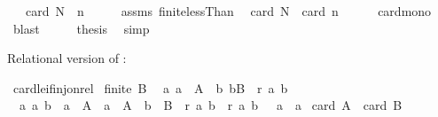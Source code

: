 \begin{isabellebody}
\ \ \ {\isachardoublequoteopen}card\ N\ {\isasymle}\ n{\isachardoublequoteclose}\isanewline
%
\isadelimproof
%
\endisadelimproof
%
\isatagproof
{}\isamarkupfalse%
\ {\isacharminus}{\kern0pt}\isanewline
\ \ \isamarkupfalse%
\ assms\ finite{\isacharunderscore}{\kern0pt}lessThan\ \isamarkupfalse%
\ {\isachardoublequoteopen}card\ N\ {\isasymle}\ card\ {\isacharbraceleft}{\kern0pt}{}{\isachardot}{\kern0pt}{\isachardot}{\kern0pt}{\isacharless}{\kern0pt}n{\isacharbraceright}{\kern0pt}{\isachardoublequoteclose}\isanewline
\ \ \ \ \isamarkupfalse%
\ card{\isacharunderscore}{\kern0pt}mono\ \isamarkupfalse%
\ blast\isanewline
\ \ \isamarkupfalse%
\ \isamarkupfalse%
\ {\isacharquery}{\kern0pt}thesis\ \isamarkupfalse%
\ simp\isanewline
{}\isamarkupfalse%
%
\endisatagproof
{\isafoldproof}%
%
\isadelimproof
%
\endisadelimproof
%
\begin{isamarkuptext}%
Relational version of :%
\end{isamarkuptext}\isamarkuptrue%
\isamarkupfalse%
\ card{\isacharunderscore}{\kern0pt}le{\isacharunderscore}{\kern0pt}if{\isacharunderscore}{\kern0pt}inj{\isacharunderscore}{\kern0pt}on{\isacharunderscore}{\kern0pt}rel{\isacharcolon}{\kern0pt}\isanewline
{}\ {\isachardoublequoteopen}finite\ B{\isachardoublequoteclose}\isanewline
\ \ {\isachardoublequoteopen}{\isasymAnd}a{\isachardot}{\kern0pt}\ a\ {\isasymin}\ A\ {\isasymLongrightarrow}\ {\isasymexists}b{\isachardot}{\kern0pt}\ b{\isasymin}B\ {\isasymand}\ r\ a\ b{\isachardoublequoteclose}\isanewline
\ \ {\isachardoublequoteopen}{\isasymAnd}a{}\ a{}\ b{\isachardot}{\kern0pt}\ {\isasymlbrakk}\ a{}\ {\isasymin}\ A{\isacharsemicolon}{\kern0pt}\ \ a{}\ {\isasymin}\ A{\isacharsemicolon}{\kern0pt}\ \ b\ {\isasymin}\ B{\isacharsemicolon}{\kern0pt}\ \ r\ a{}\ b{\isacharsemicolon}{\kern0pt}\ \ r\ a{}\ b\ {\isasymrbrakk}\ {\isasymLongrightarrow}\ a{}\ {\isacharequal}{\kern0pt}\ a{}{\isachardoublequoteclose}\isanewline
{}\ {\isachardoublequoteopen}card\ A\ {\isasymle}\ card\ B{\isachardoublequoteclose}\isanewline
%
\isadelimproof
%
\endisadelimproof
%
\isatagproof
{}\isamarkupfalse%
\ {\isacharminus}{\kern0pt}\isanewline
\ \ \isamarkupfalse%

\end{isabellebody}
